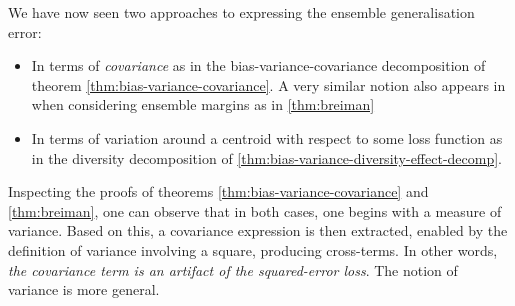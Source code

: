 \documentclass[../main.tex]{subfiles}
\begin{document}
We have now seen two approaches to expressing the ensemble generalisation error:
\begin{itemize}
\item In terms of \textit{covariance} as in the bias-variance-covariance decomposition of theorem \ref{thm:bias-variance-covariance}. A very similar notion also appears in when considering ensemble margins as in \ref{thm:breiman}
\item In terms of variation around a centroid with respect to some loss function as in the diversity decomposition of  \cref{thm:bias-variance-diversity-effect-decomp}. 
\end{itemize}
Inspecting the proofs of theorems \ref{thm:bias-variance-covariance} and \ref{thm:breiman}, one can observe that in both cases, one begins with a measure of variance. Based on this, a covariance expression is then extracted, enabled by the definition of variance involving a square, producing cross-terms.
In other words, \textit{the covariance term is an artifact of the squared-error loss}. The notion of variance is more general.
\end{document}
